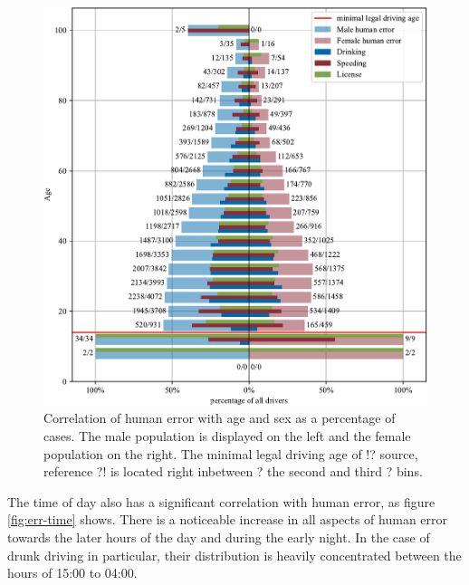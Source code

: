 \documentclass{article}
\theoremstyle{plain}
\theoremstyle{definition}
\theoremstyle{remark}
\begin{document}
\begin{figure}[ht]
	\vskip 0.2in
	\begin{center}
		\centerline{\includegraphics[width=\columnwidth]{plots/err-demography}}
		\caption{Correlation of human error with age and sex as a percentage of cases. The male population is displayed on the left and the female population on the right. The minimal legal driving age of !? source, reference ?! is located right inbetween ? the second and third ? bins.}
		\label{fig:err-demography}
	\end{center}
	\vskip -0.2in
\end{figure}

The time of day also has a significant correlation with human error, as figure \ref{fig:err-time} shows. There is a noticeable increase in all aspects of human error towards the later hours of the day and during the early night. In the case of drunk driving in particular, their distribution is heavily concentrated between the hours of 15:00 to 04:00.
\end{document}
